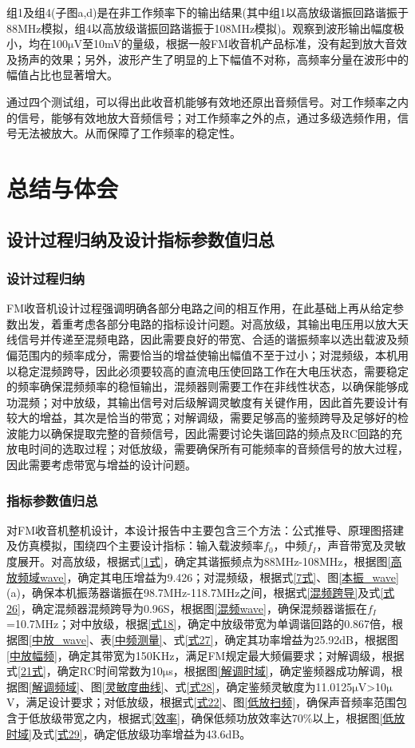 \documentclass[a4paper,12pt,twoside]{article}
\begin{document}
组1及组4(子图a,d)是在非工作频率下的输出结果(其中组1以高放级谐振回路谐振于88MHz模拟，组4以高放级谐振回路谐振于108MHz模拟)。观察到波形输出幅度极小，均在100$\mathrm{\mu}$V至10mV的量级，根据一般FM收音机产品标准\cite{调频广播接收机测量方法}\cite{频率范围从87.5至108.0MHz的VHF/FM声音广播无线电数据系统的规范替代BS}，没有起到放大音效及扬声的效果；另外，波形产生了明显的上下幅值不对称，高频率分量在波形中的幅值占比也显著增大。

通过四个测试组，可以得出此收音机能够有效地还原出音频信号。对工作频率之内的信号，能够有效地放大音频信号；对工作频率之外的点，通过多级选频作用，信号无法被放大。从而保障了工作频率的稳定性。

\section{总结与体会}
\subsection{设计过程归纳及设计指标参数值归总}
\subsubsection{设计过程归纳}
FM收音机设计过程强调明确各部分电路之间的相互作用，在此基础上再从给定参数出发，着重考虑各部分电路的指标设计问题。对高放级，其输出电压用以放大天线信号并传递至混频电路，因此需要良好的带宽、合适的谐振频率以选出载波及频偏范围内的频率成分，需要恰当的增益使输出幅值不至于过小；对混频级，本机用以稳定混频跨导，因此必须要较高的直流电压使回路工作在大电压状态，需要稳定的频率确保混频频率的稳恒输出，混频器则需要工作在非线性状态，以确保能够成功混频；对中放级，其输出信号对后级解调灵敏度有关键作用，因此首先要设计有较大的增益，其次是恰当的带宽；对解调级，需要足够高的鉴频跨导及足够好的检波能力以确保提取完整的音频信号，因此需要讨论失谐回路的频点及RC回路的充放电时间的选取过程；对低放级，需要确保所有可能频率的音频信号的放大过程，因此需要考虑带宽与增益的设计问题。
\subsubsection{指标参数值归总}
对FM收音机整机设计，本设计报告中主要包含三个方法：公式推导、原理图搭建及仿真模拟，围绕四个主要设计指标：输入载波频率$f_0$，中频$f_I$，声音带宽及灵敏度展开。对高放级，根据式\ref{1式}，确定其谐振频点为88MHz-108MHz，根据图\ref{高放频域wave}，确定其电压增益为9.426；对混频级，根据式\ref{7式}、图\ref{本振_wave}(a)，确保本机振荡器谐振在98.7MHz-118.7MHz之间，根据式\ref{混频跨导}及式\ref{式26}，确定混频器混频跨导为0.96S，根据图\ref{混频wave}，确保混频器谐振在$f_I$=10.7MHz；对中放级，根据\ref{式18}，确定中放级带宽为单调谐回路的0.867倍，根据图\ref{中放_wave}、表\ref{中频测量}、式\ref{式27}，确定其功率增益为25.92dB，根据图\ref{中放幅频}，确定其带宽为150KHz，满足FM规定最大频偏要求；对解调级，根据式\ref{21式}，确定RC时间常数为10$\mathrm{\mu}$s，根据图\ref{解调时域}，确定鉴频器成功解调，根据图\ref{解调频域}、图\ref{灵敏度曲线}、式\ref{式28}，确定鉴频灵敏度为11.0125$\mathrm{\mu}$V>10$\mathrm{\mu}$V，满足设计要求；对低放级，根据式\ref{式22}、图\ref{低放扫频}，确保声音频率范围包含于低放级带宽之内，根据式\ref{效率}，确保低频功放效率达70\%以上，根据图\ref{低放时域}及式\ref{式29}，确定低放级功率增益为43.6dB。
\end{document}

